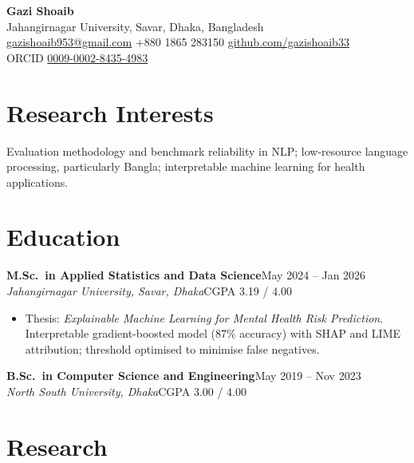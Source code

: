 \documentclass[10pt,a4paper]{article}
\newcommand{\entry}[4]{%
  \textbf{#1}\hfill{#2}\\
  \textit{#3}\hfill{#4}\\[2pt]}
\begin{document}
\begin{center}
  {\LARGE\bfseries Gazi Shoaib}\\[4pt]
  Jahangirnagar University, Savar, Dhaka, Bangladesh\\[2pt]
  \href{mailto:gazishoaib953@gmail.com}{gazishoaib953@gmail.com} \;\textbar\;
  +880 1865 283150 \;\textbar\;
  \href{https://github.com/gazishoaib33}{github.com/gazishoaib33}\\[1pt]
  {\small ORCID \href{https://orcid.org/0009-0002-8435-4983}{0009-0002-8435-4983}}
\end{center}

\vspace{2pt}

\section{Research Interests}
Evaluation methodology and benchmark reliability in NLP; low-resource language
processing, particularly Bangla; interpretable machine learning for health
applications.

\section{Education}

\entry{M.Sc.\ in Applied Statistics and Data Science}{May 2024 -- Jan 2026}
{Jahangirnagar University, Savar, Dhaka}{CGPA 3.19 / 4.00}
\begin{itemize}
\item Thesis: \textit{Explainable Machine Learning for Mental Health Risk
      Prediction}. Interpretable gradient-boosted model (87\% accuracy) with SHAP
      and LIME attribution; threshold optimised to minimise false negatives.
\end{itemize}
\vspace{2pt}

\entry{B.Sc.\ in Computer Science and Engineering}{May 2019 -- Nov 2023}
{North South University, Dhaka}{CGPA 3.00 / 4.00}

\section{Research}
\end{document}
